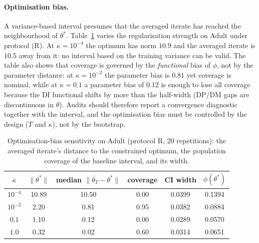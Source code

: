 \documentclass[11pt]{article}
\newcommand{\tbar}{\bar\theta}
\begin{document}
\paragraph{Optimisation bias.}
\label{par:bias}
A variance-based interval presumes that the averaged iterate has reached the neighbourhood of
$\theta^*$.  Table~\ref{tab:sensitivity} varies the regularisation strength on Adult under protocol
(R).  At $\kappa=10^{-4}$ the optimum has norm $10.9$ and the averaged iterate is $10.5$ away from
it: no interval based on the training variance can be valid.  The table also shows that coverage is
governed by the \emph{functional} bias of $\phi$, not by the parameter distance: at $\kappa=10^{-2}$
the parameter bias is $0.81$ yet coverage is nominal, while at $\kappa=0.1$ a parameter bias of
$0.12$ is enough to lose all coverage because the DI functional shifts by more than the half-width
(DP/DM gaps are discontinuous in $\theta$).  Audits should therefore report a convergence diagnostic
together with the interval, and the optimisation bias must be controlled by the design ($T$ and
$\kappa$), not by the bootstrap.

\begin{table}[t]
\centering
\caption{Optimisation-bias sensitivity on Adult (protocol R, 20 repetitions): the averaged iterate's
distance to the constrained optimum, the population coverage of the baseline interval, and its width.}
\label{tab:sensitivity}
\begin{tabular}{cccccc}
\toprule
$\kappa$ & $\|\theta^*\|$ & median $\|\tbar_T-\theta^*\|$ & coverage & CI width & $\phi(\theta^*)$ \\
\midrule
$10^{-4}$ & 10.89 & 10.50 & 0.00 & 0.0399 & 0.1394 \\
$10^{-2}$ & 2.20  & 0.81  & 0.95 & 0.0382 & 0.0884 \\
$0.1$     & 1.10  & 0.12  & 0.00 & 0.0289 & 0.0570 \\
$1.0$     & 0.32  & 0.02  & 0.60 & 0.0314 & 0.0651 \\
\bottomrule
\end{tabular}
\end{table}
\end{document}
